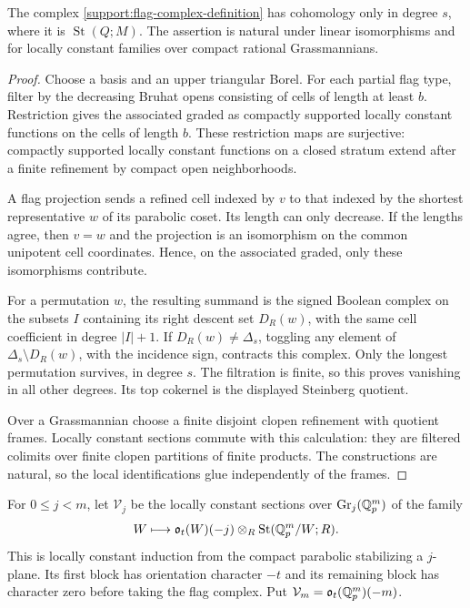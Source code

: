 \begin{lemma}\label{support:flag-complex}
The complex \eqref{support:flag-complex-definition} has cohomology
only in degree $s$, where it is $\operatorname{St}(Q;M)$.
The assertion is natural under linear isomorphisms and for locally
constant families over compact rational Grassmannians.
\end{lemma}

\begin{proof}
Choose a basis and an upper triangular Borel.  For each partial
flag type, filter by the decreasing Bruhat opens consisting of
cells of length at least $b$.  Restriction gives the associated
graded as compactly supported locally constant functions on the
cells of length $b$.  These restriction maps are surjective:
compactly supported locally constant functions on a closed stratum
extend after a finite refinement by compact open neighborhoods.

A flag projection sends a refined cell indexed by $v$ to that
indexed by the shortest representative $w$ of its parabolic
coset.  Its length can only decrease.  If the lengths agree, then
$v=w$ and the projection is an isomorphism on the common
unipotent cell coordinates.  Hence, on the associated graded,
only these isomorphisms contribute.

For a permutation $w$, the resulting summand is the signed
Boolean complex on the subsets $I$ containing its right descent
set $D_R(w)$, with the same cell coefficient in degree $|I|+1$.
If $D_R(w)\ne\Delta_s$, toggling any element of
$\Delta_s\setminus D_R(w)$, with the incidence sign, contracts
this complex.  Only the longest permutation survives, in degree
$s$.  The filtration is finite, so this proves vanishing in all
other degrees.  Its top cokernel is the displayed Steinberg
quotient.

Over a Grassmannian choose a finite disjoint clopen refinement
with quotient frames.  Locally constant sections commute with
this calculation: they are filtered colimits over finite clopen
partitions of finite products.  The constructions are natural,
so the local identifications glue independently of the frames.
\end{proof}

For $0\leq j<m$, let $\mathcal V_j$ be the locally constant
sections over $\operatorname{Gr}_j(\mathbb Q_p^m)$ of the family
\[
 W\longmapsto
 \mathfrak o_t(W)(-j)\otimes_R\operatorname{St}(\mathbb Q_p^m/W;R).
\]
This is locally constant induction from the compact parabolic
stabilizing a $j$-plane.  Its first block has orientation character
$-t$ and its remaining block has character zero before taking the
flag complex.  Put
$\mathcal V_m=\mathfrak o_t(\mathbb Q_p^m)(-m)$.

